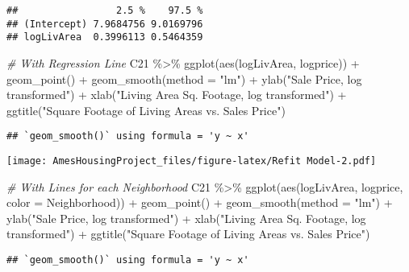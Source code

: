 \documentclass[
]{article}
\newenvironment{Shaded}{\begin{snugshade}}{\end{snugshade}}
\newcommand{\AttributeTok}[1]{\textcolor[rgb]{0.77,0.63,0.00}{#1}}
\newcommand{\CommentTok}[1]{\textcolor[rgb]{0.56,0.35,0.01}{\textit{#1}}}
\newcommand{\FunctionTok}[1]{\textcolor[rgb]{0.00,0.00,0.00}{#1}}
\newcommand{\NormalTok}[1]{#1}
\newcommand{\SpecialCharTok}[1]{\textcolor[rgb]{0.00,0.00,0.00}{#1}}
\newcommand{\StringTok}[1]{\textcolor[rgb]{0.31,0.60,0.02}{#1}}
\begin{document}
\begin{verbatim}
##                 2.5 %    97.5 %
## (Intercept) 7.9684756 9.0169796
## logLivArea  0.3996113 0.5464359
\end{verbatim}

\begin{Shaded}
\begin{Highlighting}[]
\CommentTok{\# With Regression Line}
\NormalTok{C21 }\SpecialCharTok{\%\textgreater{}\%} \FunctionTok{ggplot}\NormalTok{(}\FunctionTok{aes}\NormalTok{(logLivArea, logprice)) }\SpecialCharTok{+} 
  \FunctionTok{geom\_point}\NormalTok{() }\SpecialCharTok{+} \FunctionTok{geom\_smooth}\NormalTok{(}\AttributeTok{method =} \StringTok{"lm"}\NormalTok{) }\SpecialCharTok{+}
  \FunctionTok{ylab}\NormalTok{(}\StringTok{"Sale Price, log transformed"}\NormalTok{) }\SpecialCharTok{+} 
  \FunctionTok{xlab}\NormalTok{(}\StringTok{"Living Area Sq. Footage, log transformed"}\NormalTok{) }\SpecialCharTok{+} 
  \FunctionTok{ggtitle}\NormalTok{(}\StringTok{"Square Footage of Living Areas vs. Sales Price"}\NormalTok{)}
\end{Highlighting}
\end{Shaded}

\begin{verbatim}
## `geom_smooth()` using formula = 'y ~ x'
\end{verbatim}

\texttt{[image: AmesHousingProject\_files/figure-latex/Refit Model-2.pdf]}

\begin{Shaded}
\begin{Highlighting}[]
\CommentTok{\# With Lines for each Neighborhood}
\NormalTok{C21 }\SpecialCharTok{\%\textgreater{}\%} \FunctionTok{ggplot}\NormalTok{(}\FunctionTok{aes}\NormalTok{(logLivArea, logprice, }\AttributeTok{color =}\NormalTok{ Neighborhood)) }\SpecialCharTok{+} 
  \FunctionTok{geom\_point}\NormalTok{() }\SpecialCharTok{+} \FunctionTok{geom\_smooth}\NormalTok{(}\AttributeTok{method =} \StringTok{"lm"}\NormalTok{) }\SpecialCharTok{+}
  \FunctionTok{ylab}\NormalTok{(}\StringTok{"Sale Price, log transformed"}\NormalTok{) }\SpecialCharTok{+} 
  \FunctionTok{xlab}\NormalTok{(}\StringTok{"Living Area Sq. Footage, log transformed"}\NormalTok{) }\SpecialCharTok{+} 
  \FunctionTok{ggtitle}\NormalTok{(}\StringTok{"Square Footage of Living Areas vs. Sales Price"}\NormalTok{)}
\end{Highlighting}
\end{Shaded}

\begin{verbatim}
## `geom_smooth()` using formula = 'y ~ x'
\end{verbatim}
\end{document}
